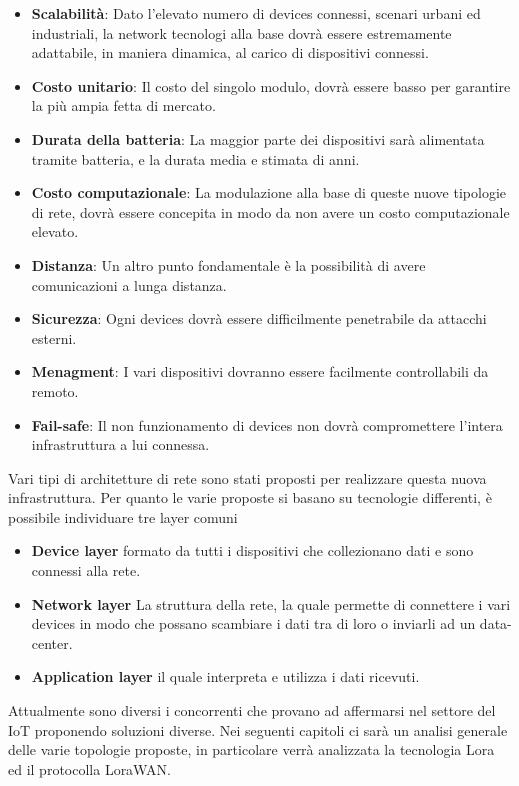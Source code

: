 \begin{itemize}
\item \textbf{Scalabilità}: Dato l'elevato numero di devices connessi, scenari
urbani ed industriali, la network tecnologi alla base dovrà essere estremamente
adattabile, in maniera dinamica, al carico di dispositivi connessi.
\item \textbf{Costo unitario}: Il costo del singolo modulo, dovrà essere basso
per garantire la più ampia fetta di mercato.
\item \textbf{Durata della batteria}: La maggior parte dei dispositivi sarà
alimentata tramite batteria, e la durata media e stimata di anni. 
\item \textbf{Costo computazionale}: La modulazione alla base di queste nuove
tipologie di rete, dovrà essere concepita in modo da non avere un costo
computazionale elevato.
\item \textbf{Distanza}: Un altro punto fondamentale è la possibilità di avere
comunicazioni a lunga distanza.
\item \textbf{Sicurezza}: Ogni devices dovrà essere difficilmente penetrabile da
attacchi esterni.
\item \textbf{Menagment}: I vari dispositivi dovranno essere facilmente
controllabili da remoto.
\item \textbf{Fail-safe}: Il non funzionamento di devices non dovrà
compromettere l'intera infrastruttura a lui connessa. 
\end{itemize}

Vari tipi di architetture di rete sono stati proposti per realizzare questa
nuova infrastruttura. Per quanto le varie proposte si basano su tecnologie
differenti, è possibile individuare tre layer comuni 
\begin{itemize}
\item \textbf{Device layer} formato da tutti i dispositivi che collezionano dati
e sono connessi alla rete.
\item \textbf{Network layer} La struttura della rete, la quale permette di
connettere i vari devices in modo che possano scambiare i dati tra di loro o
inviarli ad un data-center.
\item \textbf{Application layer} il quale interpreta e utilizza i dati ricevuti.
\end{itemize}

Attualmente sono diversi i concorrenti che provano ad affermarsi nel settore
del IoT proponendo soluzioni diverse. Nei seguenti capitoli ci sarà un analisi
generale delle varie topologie proposte, in particolare verrà analizzata la
tecnologia Lora ed il protocolla LoraWAN.

